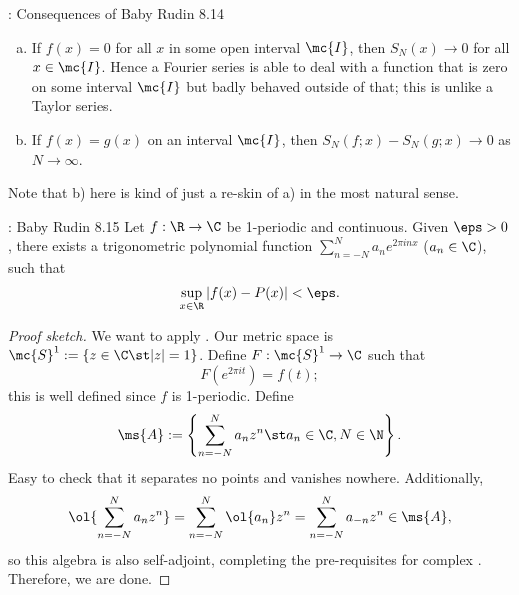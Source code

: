 \begin{ncorollary}{: Consequences of Baby Rudin 8.14}
    \begin{enumerate}[a)]
        \item If \(f(x)=0\) for all \(x\) in some open interval \(\mc{I}\), then \(S_N(x)\to 0\) for all \(x\in\mc{I}\). Hence a Fourier series is able to deal with a function that is zero on some interval \(\mc{I}\) but badly behaved outside of that; this is unlike a Taylor series.
        
        \item If \(f(x)=g(x)\) on an interval \(\mc{I}\), then \(S_N(f;x)-S_N(g;x)\to 0\) as \(N\to\infty\).
    \end{enumerate}
\end{ncorollary}
Note that b) here is kind of just a re-skin of a) in the most natural sense.
\begin{ntheorem}{: Baby Rudin 8.15}
    Let \(f:\R\to\C\) be 1-periodic and continuous. Given \(\eps>0\), there exists a trigonometric polynomial function \(\displaystyle\sum_{n=-N}^N a_ne^{2\pi inx}\) (\(a_n\in\C\)), such that 
    \begin{equation*} 
        \sup_{x\in\R}|f(x)-P(x)|<\eps.
    \end{equation*}
\end{ntheorem}
\begin{proof}[Proof sketch]
    We want to apply \SW. Our metric space is \(\mc{S}^1:=\{z\in\C\st |z|=1\}\). Define \(F:\mc{S}^1\to\C\) such that
    \begin{equation*} 
        F(e^{2\pi it})=f(t);
    \end{equation*}
    this is well defined since \(f\) is 1-periodic. Define
    \begin{equation*} 
        \ms{A}:=\left\{\sum_{n=-N}^{N} a_nz^n\st a_n\in\C, N\in\N\right\}.
    \end{equation*}
    Easy to check that it separates no points and vanishes nowhere. Additionally, 
    \begin{equation*} 
        \ol{\sum_{n=-N}^{N} a_nz^n}=\sum_{n=-N}^{N} \ol{a_n}z^n=\sum_{n=-N}^{N} a_{-n}z^n\in\ms{A},
    \end{equation*}
    so this algebra is also self-adjoint, completing the pre-requisites for complex \SW. Therefore, we are done.
\end{proof}

